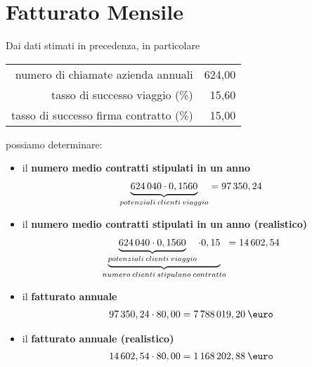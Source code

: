 \section[Fatturato Mensile]{Fatturato Mensile}
Dai dati stimati in precedenza, in particolare
\newline
\begin{center}
	\begin{tabular}{rr}
		numero di chiamate azienda annuali & 624\thinspace 040,00 \\
		tasso di successo viaggio (\%) & 15,60 \\
		tasso di successo firma contratto (\%) & 15,00 \\	
	\end{tabular}
\end{center}
possiamo determinare:
\begin{itemize}
\item il \textbf{numero medio contratti stipulati in un anno}
	\begin{equation}
	\label{eq:num_contratti_teorico_anno}
	\begin{split}
		\underbrace{624\thinspace 040 \cdot 0,1560}_{potenziali \: clienti\: viaggio} = 97\thinspace 350,24
	\end{split}
	\end{equation}

\item il \textbf{numero medio contratti stipulati in un anno (realistico)}
	\begin{equation}
	\label{eq:num_contratti_realistico_anno}
	\begin{split}
		\underbrace{\underbrace{624\thinspace 040 \cdot 0,1560}_{potenziali \: clienti\: viaggio} \cdot 0,15}_{numero \: clienti \: stipulano \: contratto} = 14\thinspace 602,54
	\end{split}
	\end{equation}

\item il \textbf{fatturato annuale}
	\begin{equation}
	\label{eq:fatturato_teorico_anno_netto}
	\begin{split}
		97\thinspace 350,24 \cdot 80,00 = 7\thinspace 788\thinspace 019,20 \: \mbox{\euro} 
	\end{split}
	\end{equation}	
	
\item il \textbf{fatturato annuale (realistico)}
	\begin{equation}
	\label{eq:fatturato_anno_netto}
	\begin{split}
		14\thinspace 602,54 \cdot 80,00 = 1\thinspace 168\thinspace 202,88 \: \mbox{\euro} 
	\end{split}
	\end{equation}


\end{itemize}
